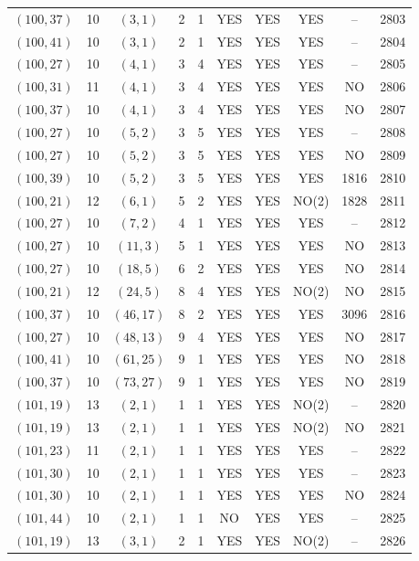 \begin{longtable}{|c|c|c|c|c|c|c|c|c|c|}
$(100, 37)$ & 10 & $(3, 1)$ & 2 & 1 & YES & YES & YES & -- & 2803\\
$(100, 41)$ & 10 & $(3, 1)$ & 2 & 1 & YES & YES & YES & -- & 2804\\
$(100, 27)$ & 10 & $(4, 1)$ & 3 & 4 & YES & YES & YES & -- & 2805\\
$(100, 31)$ & 11 & $(4, 1)$ & 3 & 4 & YES & YES & YES & NO & 2806\\
$(100, 37)$ & 10 & $(4, 1)$ & 3 & 4 & YES & YES & YES & NO & 2807\\
$(100, 27)$ & 10 & $(5, 2)$ & 3 & 5 & YES & YES & YES & -- & 2808\\
$(100, 27)$ & 10 & $(5, 2)$ & 3 & 5 & YES & YES & YES & NO & 2809\\
$(100, 39)$ & 10 & $(5, 2)$ & 3 & 5 & YES & YES & YES & 1816 & 2810\\
$(100, 21)$ & 12 & $(6, 1)$ & 5 & 2 & YES & YES & NO(2) & 1828 & 2811\\
$(100, 27)$ & 10 & $(7, 2)$ & 4 & 1 & YES & YES & YES & -- & 2812\\
$(100, 27)$ & 10 & $(11, 3)$ & 5 & 1 & YES & YES & YES & NO & 2813\\
$(100, 27)$ & 10 & $(18, 5)$ & 6 & 2 & YES & YES & YES & NO & 2814\\
$(100, 21)$ & 12 & $(24, 5)$ & 8 & 4 & YES & YES & NO(2) & NO & 2815\\
$(100, 37)$ & 10 & $(46, 17)$ & 8 & 2 & YES & YES & YES & 3096 & 2816\\
$(100, 27)$ & 10 & $(48, 13)$ & 9 & 4 & YES & YES & YES & NO & 2817\\
$(100, 41)$ & 10 & $(61, 25)$ & 9 & 1 & YES & YES & YES & NO & 2818\\
$(100, 37)$ & 10 & $(73, 27)$ & 9 & 1 & YES & YES & YES & NO & 2819\\
$(101, 19)$ & 13 & $(2, 1)$ & 1 & 1 & YES & YES & NO(2) & -- & 2820\\
$(101, 19)$ & 13 & $(2, 1)$ & 1 & 1 & YES & YES & NO(2) & NO & 2821\\
$(101, 23)$ & 11 & $(2, 1)$ & 1 & 1 & YES & YES & YES & -- & 2822\\
$(101, 30)$ & 10 & $(2, 1)$ & 1 & 1 & YES & YES & YES & -- & 2823\\
$(101, 30)$ & 10 & $(2, 1)$ & 1 & 1 & YES & YES & YES & NO & 2824\\
$(101, 44)$ & 10 & $(2, 1)$ & 1 & 1 & NO & YES & YES & -- & 2825\\
$(101, 19)$ & 13 & $(3, 1)$ & 2 & 1 & YES & YES & NO(2) & -- & 2826\\

\end{longtable}
